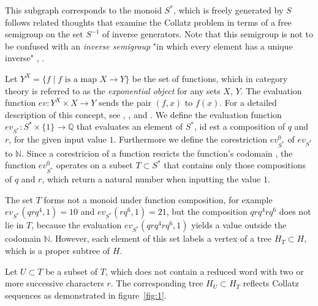 This subgraph corresponds to the monoid $S^\ast$, which is freely generated by $S$ follows related thoughts \cite{Ref_Truemper_2014} that examine the Collatz problem in terms of a free semigroup on the set $S^{-1}$ of inverse generators. Note that this semigroup is not to be confused with an \textit{inverse semigroup} "in which every element has a unique inverse" \cite[p.~26]{Ref_Almeida}, \cite[p.~22]{Ref_Loeh}.

Let $Y^X=\{f\mid f\text{ is a map }X\rightarrow Y\}$ be the set of functions, which in category theory is referred to as the \textit{exponential object} for any sets $X$, $Y$. The evaluation function $ev:Y^X\times X\to Y$ sends the pair $(f,x)$ to $f(x)$. For a detailed description of this concept, see \cite[p.~127]{Ref_Johnsonbaugh}, \cite[p.~155]{Ref_MacLane_Birkhoff}, \cite[p.~54]{Ref_Novak_etal} and \cite[p.~188]{Ref_Pellissier}. We define the evaluation function $ev_{S^\ast}:S^\ast\times\{1\}\rightarrow\mathbb{Q}$ that evaluates an element of $S^\ast$, id est a composition of $q$ and $r$, for the given input value $1$. Furthermore we define the corestriction ${ev^0_{S^\ast}}$ of $ev_{S^\ast}$ to $\mathbb{N}$. Since a corestricion of a function resricts the function's codomain \cite[p.~3]{Ref_Helemskii}, the function $ev^0_{S^\ast}$ operates on a subset $T\subset S^\ast$ that contains only those compositions of $q$ and $r$, which return a natural number when inputting the value $1$.

The set $T$ forms not a monoid under function composition, for example $ev_{S^\ast}(qrq^4,1)=10$ and $ev_{S^\ast}(rq^6,1)=21$, but the composition $qrq^4rq^6$ does not lie in $T$, because the evaluation $ev_{S^\ast}(qrq^4rq^6,1)$ yields a value outside the codomain $\mathbb{N}$. However, each element of this set labels a vertex of a tree $H_{T}\subset H$, which is a proper subtree of $H$.

Let $U\subset T$ be a subset of $T$, which does not contain a reduced word with two or more successive characters $r$. The corresponding tree $H_{U}\subset H_{T}$ reflects Collatz sequences as demonstrated in figure~\ref{fig:1}.

